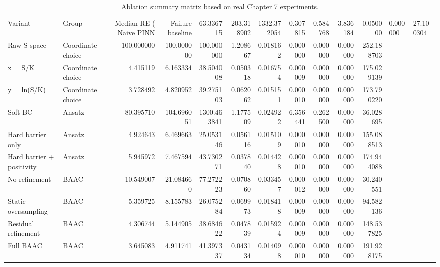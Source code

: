 \begin{table}
\caption{Ablation summary matrix based on real Chapter 7 experiments.}
\label{tab:ablation_summary_matrix_real}
\begin{tabular}{llrrrrrrrrr}
\toprule
Variant & Group & Median RE (%
\midrule
Naive PINN & Failure baseline & 63.336715 & 203.318902 & 1332.372054 & 0.307815 & 0.584768 & 3.836184 & 0.050000 & 0.000000 & 27.100304 \\
Raw S-space & Coordinate choice & 100.000000 & 100.000000 & 100.000000 & 1.208667 & 0.018162 & 0.000000 & 0.000000 & 0.000000 & 252.188703 \\
x = S/K & Coordinate choice & 4.415119 & 6.163334 & 38.504008 & 0.050318 & 0.016754 & 0.000009 & 0.000000 & 0.000000 & 175.029139 \\
y = ln(S/K) & Coordinate choice & 3.728492 & 4.820952 & 39.275103 & 0.062062 & 0.015151 & 0.000010 & 0.000000 & 0.000000 & 173.790220 \\
Soft BC & Ansatz & 80.395710 & 104.696051 & 1300.463841 & 1.177509 & 0.024922 & 6.356441 & 0.262500 & 0.000000 & 36.028695 \\
Hard barrier only & Ansatz & 4.924643 & 6.469663 & 25.053146 & 0.056116 & 0.015109 & 0.000010 & 0.000000 & 0.000000 & 155.088513 \\
Hard barrier + positivity & Ansatz & 5.945972 & 7.467594 & 43.730271 & 0.037840 & 0.014428 & 0.000010 & 0.000000 & 0.000000 & 174.944088 \\
No refinement & BAAC & 10.549007 & 21.084660 & 77.272223 & 0.070860 & 0.033457 & 0.000012 & 0.000000 & 0.000000 & 30.240551 \\
Static oversampling & BAAC & 5.359725 & 8.155783 & 26.075284 & 0.069973 & 0.018418 & 0.000009 & 0.000000 & 0.000000 & 94.582136 \\
Residual refinement & BAAC & 4.306744 & 5.144905 & 38.684622 & 0.047839 & 0.015924 & 0.000009 & 0.000000 & 0.000000 & 148.537825 \\
Full BAAC & BAAC & 3.645083 & 4.911741 & 41.397337 & 0.043134 & 0.014098 & 0.000010 & 0.000000 & 0.000000 & 191.928175 \\
\bottomrule
\end{tabular}
\end{table}
